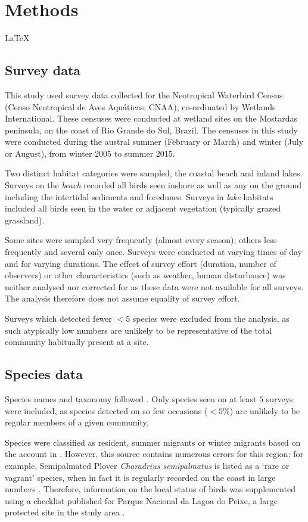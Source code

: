 \documentclass[12pt,a4paper]{book}
\begin{document}
\newpage
\section{Methods}

\LaTeX

\subsection{Survey data}

This study used survey data collected for the Neotropical Waterbird Census (Censo Neotropical de Aves Aqu\'{a}ticas; CNAA), co-ordinated by Wetlands International. These censuses were conducted at wetland sites on the Mostardas peninsula, on the coast of Rio Grande do Sul, Brazil. The censuses in this study were conducted during the austral summer (February or March) and winter (July or August), from winter 2005 to summer 2015. 

Two distinct habitat categories were sampled, the coastal beach and inland lakes. Surveys on the \textit{beach} recorded all birds seen inshore as well as any on the ground including the intertidal sediments and foredunes. Surveys in \textit{lake} habitats included all birds seen in the water or adjacent vegetation (typically grazed grassland).

Some sites were sampled very frequently (almost every season); others less frequently and several only once. Surveys were conducted at varying times of day and for varying durations. The effect of survey effort (duration, number of observers) or other characteristics (such as weather, human disturbance) was neither analysed nor corrected for as these data were not available for all surveys. The analysis therefore does not assume equality of survey effort. 

Surveys which detected fewer $< 5$ species were excluded from the analysis, as such atypically low numbers are unlikely to be representative of the total community habitually present at a site. 

\subsection{Species data}

Species names and taxonomy followed \citet{vanPerlo2009}. Only species seen on at least $5$ surveys were included, as species detected on so few occasions ($<5\%$) are unlikely to be regular members of a given community. 

Species were classified as resident, summer migrants or winter migrants based on the account in \citet{vanPerlo2009}. However, this source contains numerous errors for this region; for example, Semipalmated Plover \textit{Charadrius semipalmatus} is listed as a `rare or vagrant' species, when in fact it is regularly recorded on the coast in large numbers \citep[e.g.][and pers. obs]{Sanabria2011, Scherer2012}. Therefore, information on the local status of birds was supplemented using a checklist published for Parque Nacional da Lagoa do Peixe, a large protected site in the study area \citep{Nascimento1995}.
\end{document}
